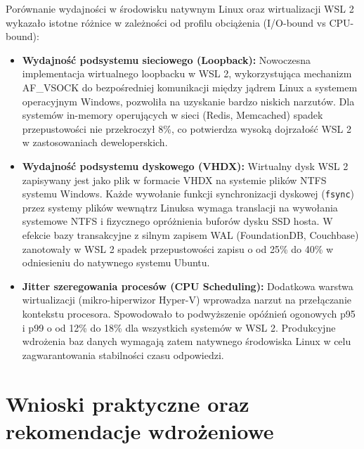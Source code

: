Porównanie wydajności w środowisku natywnym Linux oraz wirtualizacji WSL 2 wykazało istotne różnice w zależności od profilu obciążenia (I/O-bound vs CPU-bound):
\begin{itemize}
    \item \textbf{Wydajność podsystemu sieciowego (Loopback):} Nowoczesna implementacja wirtualnego loopbacku w WSL 2, wykorzystująca mechanizm AF\_VSOCK do bezpośredniej komunikacji między jądrem Linux a systemem operacyjnym Windows, pozwoliła na uzyskanie bardzo niskich narzutów. Dla systemów in-memory operujących w sieci (Redis, Memcached) spadek przepustowości nie przekroczył 8\%, co potwierdza wysoką dojrzałość WSL 2 w zastosowaniach deweloperskich.
    \item \textbf{Wydajność podsystemu dyskowego (VHDX):} Wirtualny dysk WSL 2 zapisywany jest jako plik w formacie VHDX na systemie plików NTFS systemu Windows. Każde wywołanie funkcji synchronizacji dyskowej (\texttt{fsync}) przez systemy plików wewnątrz Linuksa wymaga translacji na wywołania systemowe NTFS i fizycznego opróżnienia buforów dysku SSD hosta. W efekcie bazy transakcyjne z silnym zapisem WAL (FoundationDB, Couchbase) zanotowały w WSL 2 spadek przepustowości zapisu o od 25\% do 40\% w odniesieniu do natywnego systemu Ubuntu.
    \item \textbf{Jitter szeregowania procesów (CPU Scheduling):} Dodatkowa warstwa wirtualizacji (mikro-hiperwizor Hyper-V) wprowadza narzut na przełączanie kontekstu procesora. Spowodowało to podwyższenie opóźnień ogonowych p95 i p99 o od 12\% do 18\% dla wszystkich systemów w WSL 2. Produkcyjne wdrożenia baz danych wymagają zatem natywnego środowiska Linux w celu zagwarantowania stabilności czasu odpowiedzi.
\end{itemize}

\section{Wnioski praktyczne oraz rekomendacje wdrożeniowe}

